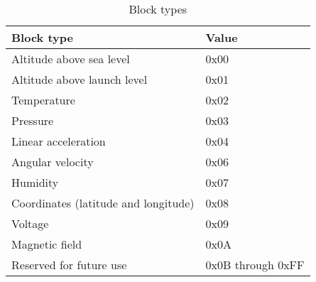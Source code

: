 \begin{table}[H]
    \centering
    \begin{tabular}{@{}ll@{}}
        \toprule
        Block type                           & Value             \\
        \midrule
        Altitude above sea level             & 0x00              \\
        Altitude above launch level          & 0x01              \\
        Temperature                          & 0x02              \\
        Pressure                             & 0x03              \\
        Linear acceleration                  & 0x04              \\
        Angular velocity                     & 0x06              \\
        Humidity                             & 0x07              \\
        Coordinates (latitude and longitude) & 0x08              \\
        Voltage                              & 0x09              \\
        Magnetic field                       & 0x0A              \\
        Reserved for future use              & 0x0B through 0xFF \\
        \bottomrule
    \end{tabular}
    \caption{Block types}
    \label{table:block-types}
\end{table}

